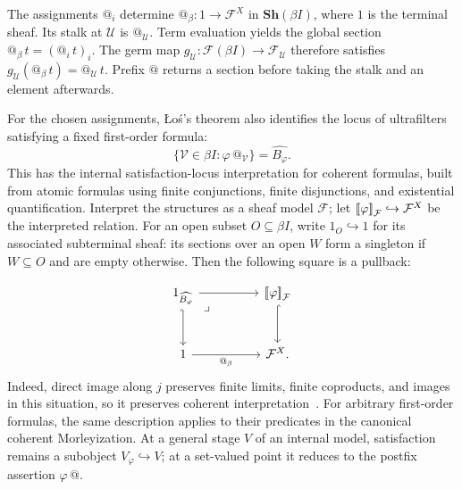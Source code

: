 \documentclass[11pt]{article}
\makeatletter
\newcommand{\llbracket}{\mathopen{[\mkern-3mu[}}
\newcommand{\rrbracket}{\mathclose{]\mkern-3mu]}}
\newcommand{\atsign}{\mathord{@}}
\makeatother
\begin{document}
The assignments \(\atsign_i\) determine
\(\atsign_\beta:1\to\mathcal F^X\) in
\(\mathbf{Sh}(\beta I)\), where \(1\) is the terminal sheaf.
Its stalk at \(\mathcal U\) is \(\atsign_{\mathcal U}\).
Term evaluation yields the global section
\(\atsign_\beta\,t=(\atsign_i\,t)_i\).
The germ map \(g_{\mathcal U}:\mathcal F(\beta I)\to\mathcal F_{\mathcal U}\)
therefore satisfies
\(g_{\mathcal U}(\atsign_\beta\,t)=\atsign_{\mathcal U}\,t\).
Prefix \(\atsign\) returns a section before taking the stalk and an
element afterwards.

For the chosen assignments, \L{}o\'s's theorem also identifies the locus
of ultrafilters satisfying a fixed first-order formula:
\[
\{\mathcal V\in\beta I:\varphi\,\atsign_{\mathcal V}\}
=\widehat{B_\varphi}.
\]
This has the internal satisfaction-locus interpretation for coherent
formulas, built from atomic formulas using finite conjunctions, finite
disjunctions, and existential quantification. Interpret the structures
as a sheaf model \(\mathcal F\); let
\(\llbracket\varphi\rrbracket_{\mathcal F}\hookrightarrow\mathcal F^X\)
be the interpreted relation. For an open subset \(O\subseteq\beta I\),
write \(1_O\hookrightarrow1\) for its associated subterminal sheaf:
its sections over an open \(W\) form a singleton if \(W\subseteq O\)
and are empty otherwise.
Then the following square is a pullback:

\[
\begin{tikzcd}[row sep=large,column sep=huge]
1_{\widehat{B_\varphi}} \arrow[r] \arrow[d,hook']
  \arrow[dr,phantom,"\lrcorner",very near start] &
\llbracket\varphi\rrbracket_{\mathcal F} \arrow[d,hook] \\
1 \arrow[r,"\atsign_\beta"'] & \mathcal F^X.
\end{tikzcd}
\]
Indeed, direct image along \(j\) preserves finite limits, finite
coproducts, and images in this situation, so it preserves coherent
interpretation~\cite[Corollary~1.10]{HaineCondensedPoints}.
For arbitrary first-order formulas, the same description applies to
their predicates in the canonical coherent Morleyization.
At a general stage \(V\) of an internal model, satisfaction remains a
subobject \(V_\varphi\hookrightarrow V\); at a set-valued point it
reduces to the postfix assertion \(\varphi\,\atsign\).
\end{document}
